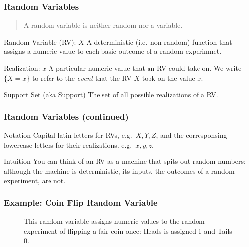 \documentclass[handout]{beamer}
\begin{document}
\def\RVraw{(-2.5,0) circle [radius=1.7]
	(-2.5,0) circle [radius=1.7]
	(2.5,0) circle [radius=1.7]
	node [above left] at (-3.75,1.25) {$S$}
	node [above right] at (3.75,1.25) {$\mathbb{R}$}
	node [above] at (0,2) {$X\colon S \mapsto \mathbb{R}$}}
\begin{frame}
  \frametitle{Random Variables}
  \begin{quote}
    A random variable is neither random nor a variable.
  \end{quote}
\begin{block}{Random Variable (RV): $X$}
  A deterministic (i.e.\ non-random) function that assigns a numeric value to each basic outcome of a random experimnet.
\end{block}
 
\begin{block}{Realization: $x$}
A particular numeric value that an RV could take on. We write $\{X = x\}$ to refer to the \emph{event} that the RV $X$ took on the value $x$.  
\end{block}
 
\begin{block}{Support Set (aka Support)}
The set of all possible realizations of a RV.
\end{block}
 
\end{frame}
\begin{frame}
  \frametitle{Random Variables (continued)}
\begin{block}{Notation}
Capital latin letters for RVs, e.g.\ $X,Y,Z$, and the corresponsing lowercase letters for their realizations, e.g.\ $x,y,z$.
\end{block}

\begin{block}{Intuition}
  You can think of an RV as a machine that spits out random numbers: although the machine is deterministic, its inputs, the outcomes of a random experiment, are not.
\end{block}
\end{frame}
\begin{frame}
\frametitle{Example: Coin Flip Random Variable}

\begin{figure}
\centering
{}
\caption{This random variable assigns numeric values to the random experiment of flipping a fair coin once: Heads is assigned 1 and Tails 0.}
\end{figure}
\end{frame}
\end{document}

